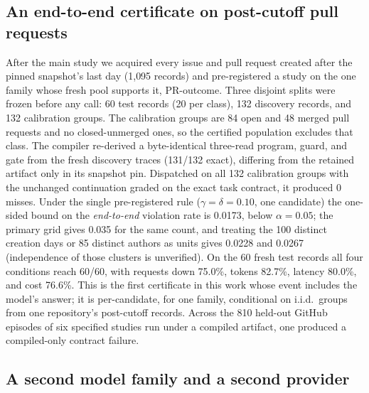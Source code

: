 \subsection{An end-to-end certificate on post-cutoff pull requests}
\label{sec:later-fresh}

After the main study we acquired every  issue and pull request
created after the pinned snapshot's last day (1{,}095 records) and pre-registered a study
on the one family whose fresh pool supports it, PR-outcome. Three disjoint splits were
frozen before any call: 60 test records (20 per class), 132 discovery records, and 132
calibration groups. The calibration groups are 84 open and 48 merged pull requests and no
closed-unmerged ones, so the certified population excludes that class. The compiler
re-derived a byte-identical three-read program, guard, and gate from the fresh discovery
traces (131/132 exact), differing from the retained artifact only in its snapshot pin.
Dispatched on all 132 calibration groups with the unchanged continuation graded on the
exact task contract, it produced 0 misses. Under the single pre-registered rule
($\gamma=\delta=0.10$, one candidate) the one-sided bound on the \emph{end-to-end}
violation rate is 0.0173, below $\alpha=0.05$; the primary grid gives 0.035 for the same
count, and treating the 100 distinct creation days or 85 distinct authors as units gives
0.0228 and 0.0267 (independence of those clusters is unverified). On the 60 fresh test
records all four conditions reach 60/60, with requests down 75.0\%, tokens 82.7\%,
latency 80.0\%, and cost 76.6\%. This is the first certificate in this work whose event
includes the model's answer; it is per-candidate, for one family, conditional on i.i.d.\
groups from one repository's post-cutoff records. Across the 810 held-out GitHub episodes
of six specified studies run under a compiled artifact, one produced a compiled-only
contract failure.

\subsection{A second model family and a second provider}
\label{sec:later-replication}

